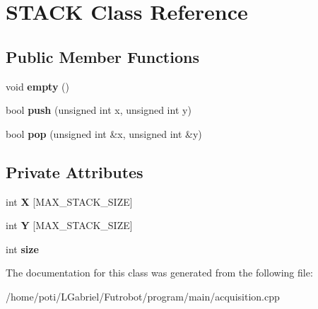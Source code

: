 \hypertarget{classSTACK}{}\section{S\+T\+A\+CK Class Reference}
\label{classSTACK}
\subsection*{Public Member Functions}
\begin{DoxyCompactItemize}
\item 
void {\bfseries empty} ()\hypertarget{classSTACK_aa240957059e0c2ea172bb34b3a8ec0b6}{}\label{classSTACK_aa240957059e0c2ea172bb34b3a8ec0b6}

\item 
bool {\bfseries push} (unsigned int x, unsigned int y)\hypertarget{classSTACK_a36377125bfdb6af851a281116cb0585e}{}\label{classSTACK_a36377125bfdb6af851a281116cb0585e}

\item 
bool {\bfseries pop} (unsigned int \&x, unsigned int \&y)\hypertarget{classSTACK_a40fdcb505d4e1da10bdee1db25e84263}{}\label{classSTACK_a40fdcb505d4e1da10bdee1db25e84263}

\end{DoxyCompactItemize}
\subsection*{Private Attributes}
\begin{DoxyCompactItemize}
\item 
int {\bfseries X} \mbox{[}M\+A\+X\+\_\+\+S\+T\+A\+C\+K\+\_\+\+S\+I\+ZE\mbox{]}\hypertarget{classSTACK_ad68c753aca9e558200db9078e3288071}{}\label{classSTACK_ad68c753aca9e558200db9078e3288071}

\item 
int {\bfseries Y} \mbox{[}M\+A\+X\+\_\+\+S\+T\+A\+C\+K\+\_\+\+S\+I\+ZE\mbox{]}\hypertarget{classSTACK_a4e1b81e08529cc8b915a543f9f56d25b}{}\label{classSTACK_a4e1b81e08529cc8b915a543f9f56d25b}

\item 
int {\bfseries size}\hypertarget{classSTACK_ad10f9d8025122e8c82832d7a34c77e40}{}\label{classSTACK_ad10f9d8025122e8c82832d7a34c77e40}

\end{DoxyCompactItemize}


The documentation for this class was generated from the following file\+:\begin{DoxyCompactItemize}
\item 
/home/poti/\+L\+Gabriel/\+Futrobot/program/main/acquisition.\+cpp\end{DoxyCompactItemize}
